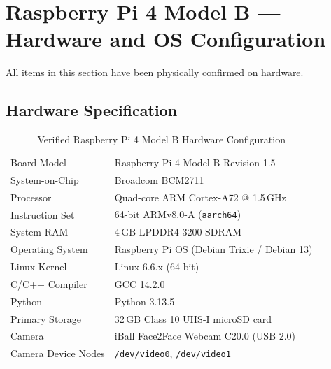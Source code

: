 \documentclass[12pt,a4paper]{article}
\begin{document}
\clearpage

\section{Raspberry Pi 4 Model B --- Hardware and OS Configuration}

\begin{verifiedbox}
All items in this section have been physically confirmed on hardware.
\end{verifiedbox}

\subsection{Hardware Specification}

\renewcommand{\arraystretch}{1.30}
\begin{table}[H]
\centering
\caption{Verified Raspberry Pi 4 Model B Hardware Configuration}
\label{tab:rpi_hw}
\small
\begin{tabularx}{\linewidth}{@{} L{4.5cm} X @{}}
\toprule
{} &  \\
\midrule
{}
Board Model          & Raspberry Pi 4 Model B Revision 1.5 \\
System-on-Chip       & Broadcom BCM2711 \\
Processor            & Quad-core ARM Cortex-A72 @ 1.5\,GHz \\
Instruction Set      & 64-bit ARMv8.0-A (\texttt{aarch64}) \\
System RAM           & 4\,GB LPDDR4-3200 SDRAM \\
Operating System     & Raspberry Pi OS (Debian Trixie / Debian 13) \\
Linux Kernel         & Linux 6.6.x (64-bit) \\
C/C++ Compiler       & GCC 14.2.0 \\
Python               & Python 3.13.5 \\
Primary Storage      & 32\,GB Class 10 UHS-I microSD card \\
Camera               & iBall Face2Face Webcam C20.0 (USB 2.0) \\
Camera Device Nodes  & \texttt{/dev/video0}, \texttt{/dev/video1} \\
\bottomrule
\end{tabularx}
\end{table}
\end{document}
